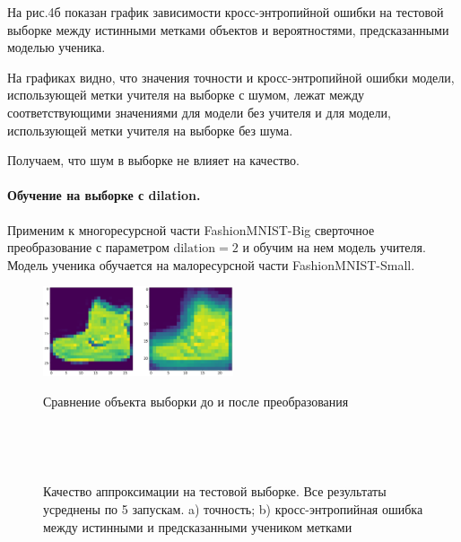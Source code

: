 На рис.4б показан график зависимости кросс-энтропийной ошибки на тестовой выборке между истинными метками объектов и вероятностями, предсказанными моделью ученика.

На графиках видно, что значения точности и кросс-энтропийной ошибки модели, использующей метки учителя на выборке с шумом, лежат между соответствующими значениями для модели без учителя и для модели, использующей метки учителя на выборке без шума.

Получаем, что шум в выборке не влияет на качество.

\paragraph{Обучение на выборке с dilation.}
Применим к многоресурсной части FashionMNIST-Big сверточное преобразование с параметром $\text{dilation}=2$ и обучим на нем модель учителя. Модель ученика обучается на малоресурсной части FashionMNIST-Small.

\begin{figure}[h!t]\center
{\includegraphics[width=0.5\textwidth]{results/dilation}}
\caption{Сравнение объекта выборки до и после преобразования}
\end{figure}\\

\begin{figure}[h!t]\center
{}
\\
\caption{Качество аппроксимации на тестовой выборке. Все результаты усреднены по 5 запускам. a) точность; b) кросс-энтропийная ошибка между истинными и предсказанными учеником метками}
\end{figure}


